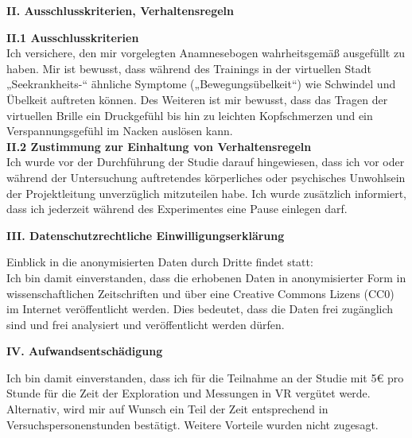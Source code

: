 \begin{center}
	\large{\textbf{II. Ausschlusskriterien, Verhaltensregeln}} \\
\end{center}

\textbf{II.1 Ausschlusskriterien} \\

Ich versichere, den mir vorgelegten Anamnesebogen wahrheitsgemäß ausgefüllt zu haben. Mir ist bewusst, dass während des Trainings in der virtuellen Stadt „Seekrankheits-“ ähnliche Symptome („Bewegungsübelkeit“) wie Schwindel und Übelkeit auftreten können. Des Weiteren ist mir bewusst, dass das Tragen der virtuellen Brille ein Druckgefühl bis hin zu leichten Kopfschmerzen und ein Verspannungsgefühl im Nacken auslösen kann.  \\

\textbf{II.2 Zustimmung zur Einhaltung von Verhaltensregeln} \\

Ich wurde vor der Durchführung der Studie darauf hingewiesen, dass ich vor oder während der Untersuchung auftretendes körperliches oder psychisches Unwohlsein der Projektleitung unverzüglich mitzuteilen habe. Ich wurde zusätzlich informiert, dass ich jederzeit während des Experimentes eine Pause einlegen darf. \\

\begin{center}
	\large{\textbf{III. Datenschutzrechtliche Einwilligungserklärung}} \\
\end{center}


Einblick in die anonymisierten Daten durch Dritte findet statt: \\

Ich bin damit einverstanden, dass die erhobenen Daten in anonymisierter Form in wissenschaftlichen Zeitschriften und über eine Creative Commons Lizens (CC0) im Internet veröffentlicht werden. Dies bedeutet, dass die Daten frei zugänglich sind und frei analysiert und veröffentlicht werden dürfen. \\

\begin{center}
	\large{\textbf{IV. Aufwandsentschädigung}} \\
\end{center}


Ich bin damit einverstanden, dass ich für die Teilnahme an der Studie mit  5€ pro Stunde für die Zeit der Exploration und Messungen in VR vergütet werde. Alternativ, wird mir auf Wunsch ein Teil der Zeit entsprechend in Versuchspersonenstunden bestätigt. Weitere Vorteile wurden nicht zugesagt. \\


